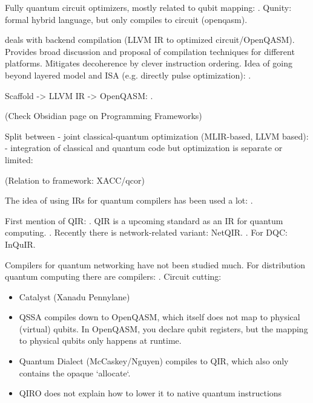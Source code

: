 Fully quantum circuit optimizers, mostly related to qubit mapping: \cite{li_tackling_2019, zhang_context, bandic_mapping_2023, nishio_extracting_2020}.
Qunity: formal hybrid language, but only compiles to circuit (openqasm).

\cite{murali_noise-adaptive_2019} deals with backend compilation (LLVM IR to optimized circuit/OpenQASM).
\cite{murali_full-stack_2019} Provides broad discussion and proposal of compilation techniques for different platforms.
\cite{smith_error_2021} Mitigates decoherence by clever instruction ordering.
Idea of going beyond layered model and ISA (e.g. directly pulse optimization): \cite{shi_resource-efficient_2020}.

Scaffold -> LLVM IR -> OpenQASM: \cite{litteken_updated_2020}.

(Check Obsidian page on Programming Frameworks)

Split between
- joint classical-quantum optimization (MLIR-based, LLVM based): \cite{mccaskey_mlir_2021, ittah_enabling_2022, nguyen_retargetable_2022, peduri_qssa_2022}
- integration of classical and quantum code but optimization is separate or limited: \cite{litteken_updated_2020, fux_quingo_2021, khalate_llvm-based_2022, younis_quantum_2022}


(Relation to framework: XACC/qcor)



The idea of using IRs for quantum compilers has been used a lot: \cite{nigam_compiler_2021, nishio_inquir_2023}.

First mention of QIR: \cite{haner_software_2018}.
QIR is a upcoming standard as an IR for quantum computing. \cite{geller_introducing_2020}.
Recently there is network-related variant: NetQIR. \cite{vazquez-perez_netqir_2024}.
For DQC: InQuIR.

Compilers for quantum networking have not been studied much.
For distribution quantum computing there are compilers: \cite{ferrari_compiler_2021, haner_distributed_2021, cuomo_optimized_2023, ferrari_modular_2023}.
Circuit cutting: \cite{chatterjee_qurzon_2022}



\begin{itemize}
\item Catalyst (Xanadu Pennylane)
\item QSSA compiles down to OpenQASM, which itself does not map to physical (virtual) qubits. In OpenQASM, you declare qubit registers, but the mapping to physical qubits only happens at runtime.
\item Quantum Dialect (McCaskey/Nguyen) compiles to QIR, which also only contains the opaque `allocate`.
\item QIRO does not explain how to lower it to native quantum instructions
\end{itemize}

